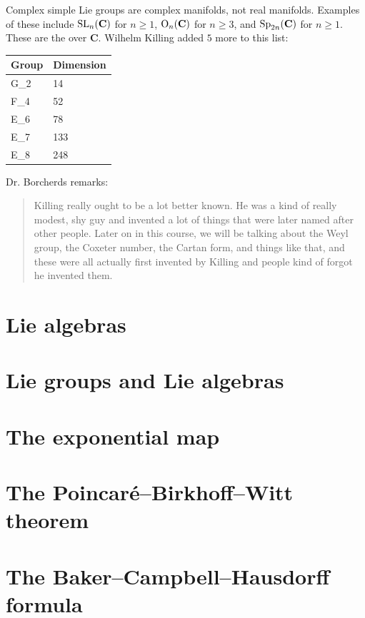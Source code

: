\documentclass [11 pt, oneside] {article}
\begin{document}
Complex simple Lie groups are complex manifolds, not real manifolds. Examples of these include $\operatorname{SL}_{n}(\mathbf{C})$ for $n\ge 1$, $\operatorname{O}_{n}(\mathbf{C})$ for $n\ge 3$, and $\operatorname{Sp}_{2n}(\mathbf{C})$ for $n\ge 1$. These are the  over $\mathbf{C}$.
Wilhelm Killing added $5$ more to this list:
\begin{center}
\begin{tabular}{ll}
    Group & Dimension\\
    \midrule
    G_2 & 14\\
    F_4 & 52\\
    E_6 & 78\\
    E_7 & 133\\
    E_8 & 248
\end{tabular}
\end{center}
Dr. Borcherds remarks:
\begin{quote}
	\small Killing really ought to be a lot better known. He was a kind of really modest, shy guy and invented a lot of things that were later named after other people. Later on in this course, we will be talking about the Weyl group, the Coxeter number, the Cartan form, and things like that, and these were all actually first invented by Killing and people kind of forgot he invented them.
\end{quote}

\iffalse
\section {Lie algebras}

\section {Lie groups and Lie algebras}

\section {The exponential map}

\section {The Poincar\'e--Birkhoff--Witt theorem}

\section {The Baker--Campbell--Hausdorff formula}
\end{document}
